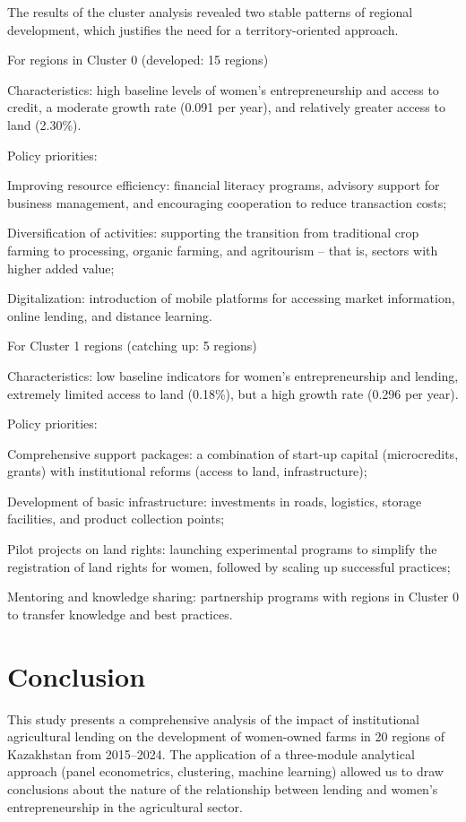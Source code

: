 ﻿\documentclass[pdflatex,sn-mathphys-ay]{sn-jnl}
\begin{document}
The results of the cluster analysis revealed two stable patterns of
regional development, which justifies the need for a territory-oriented
approach.

For regions in Cluster 0 (developed: 15 regions)

Characteristics: high baseline levels of women's entrepreneurship and
access to credit, a moderate growth rate (0.091 per year), and
relatively greater access to land (2.30\%).

Policy priorities:

Improving resource efficiency: financial literacy programs, advisory
support for business management, and encouraging cooperation to reduce
transaction costs;

Diversification of activities: supporting the transition from
traditional crop farming to processing, organic farming, and agritourism
-- that is, sectors with higher added value;

Digitalization: introduction of mobile platforms for accessing market
information, online lending, and distance learning.

For Cluster 1 regions (catching up: 5 regions)

Characteristics: low baseline indicators for women's entrepreneurship
and lending, extremely limited access to land (0.18\%), but a high
growth rate (0.296 per year).

Policy priorities:

Comprehensive support packages: a combination of start-up capital
(microcredits, grants) with institutional reforms (access to land,
infrastructure);

Development of basic infrastructure: investments in roads, logistics,
storage facilities, and product collection points;

Pilot projects on land rights: launching experimental programs to
simplify the registration of land rights for women, followed by scaling
up successful practices;

Mentoring and knowledge sharing: partnership programs with regions in
Cluster 0 to transfer knowledge and best practices.

\section{Conclusion}

This study presents a comprehensive analysis of the impact of
institutional agricultural lending on the development of women-owned
farms in 20 regions of Kazakhstan from 2015--2024. The
application of a three-module analytical approach (panel econometrics,
clustering, machine learning) allowed us to draw conclusions about the
nature of the relationship between lending and women's entrepreneurship
in the agricultural sector.
\end{document}
